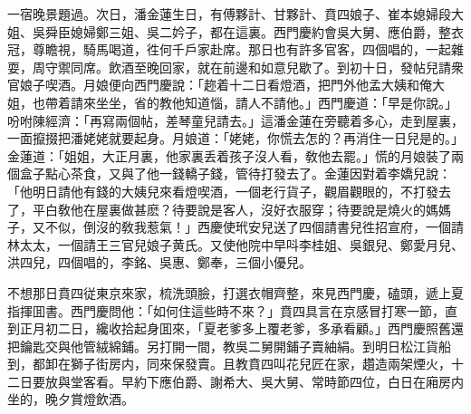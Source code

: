 一宿晚景題過。次日，潘金蓮生日，有傅夥計、甘夥計、賁四娘子、崔本媳婦段大姐、吳舜臣媳婦鄭三姐、吳二妗子，都在這裏。西門慶約會吳大舅、應伯爵，整衣冠，尊瞻視，騎馬喝道，徃何千戶家赴席。那日也有許多官客，四個唱的，一起雜耍，周守禦同席。飲酒至晚回家，就在前邊和如意兒歇了。到初十日，發帖兒請衆官娘子喫酒。月娘便向西門慶說：「趂着十二日看燈酒，把門外他孟大姨和俺大姐，也帶着請來坐坐，省的教他知道惱，請人不請他。」西門慶道：「早是你說。」吩咐陳經濟：「再寫兩個帖，差琴童兒請去。」這潘金蓮在旁聽着多心，走到屋裏，一面攛掇把潘姥姥就要起身。月娘道：「姥姥，你慌去怎的？再消住一日兒是的。」金蓮道：「姐姐，大正月裏，他家裏丢着孩子沒人看，敎他去罷。」慌的月娘裝了兩個盒子點心茶食，又與了他一錢轎子錢，管待打發去了。金蓮因對着李嬌兒說：「他明日請他有錢的大姨兒來看燈喫酒，一個老行貨子，觀眉觀眼的，不打發去了，平白敎他在屋裏做甚麽？待要說是客人，沒好衣服穿；待要說是燒火的媽媽子，又不似，倒沒的敎我惹氣！」西慶使玳安兒送了四個請書兒徃招宣府，一個請林太太，一個請王三官兒娘子黄氏。又使他院中早呌李桂姐、吳銀兒、鄭愛月兒、洪四兒，四個唱的，李銘、吳惠、鄭奉，三個小優兒。

不想那日賁四従東京來家，梳洗頭臉，打選衣帽齊整，來見西門慶，磕頭，遞上夏指揮囬書。西門慶問他：「如何住這些時不來？」賁四具言在京感冒打寒一節，直到正月初二日，纔收拾起身囬來，「夏老爹多上覆老爹，多承看顧。」西門慶照舊還把鑰匙交與他管絨綿鋪。另打開一間，教吳二舅開鋪子賣紬絹。到明日松江貨船到，都卸在獅子街房内，同來保發賣。且教賁四叫花兒匠在家，趲造兩架煙火，十二日要放與堂客看。早約下應伯爵、謝希大、吳大舅、常時節四位，白日在廂房内坐的，晚夕賞燈飲酒。

